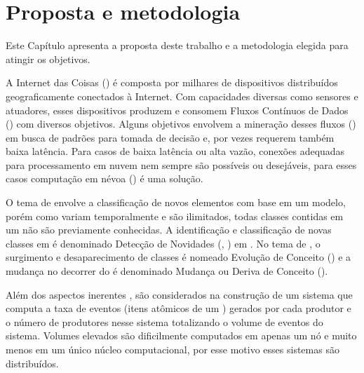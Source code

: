 \chapter{Proposta e metodologia}\label{cha:proposta}

\begin{resumocap}

  Este Capítulo apresenta a proposta deste trabalho e a metodologia elegida para
  atingir os objetivos.

\end{resumocap}


\newcommand{\mfog}{M-FOG\xspace}
\newcommand{\flink}{\emph{Apache Flink}\xspace}

A Internet das Coisas (\iot) é composta por milhares de dispositivos distribuídos
geograficamente conectados à Internet.
Com capacidades diversas como sensores e atuadores, esses dispositivos produzem e
consomem Fluxos Contínuos de Dados (\streams) com diversos objetivos.
Alguns objetivos envolvem a mineração desses fluxos (\streamMining) em busca de
padrões para tomada de decisão e, por vezes requerem também baixa latência.
Para casos de baixa latência ou alta vazão, conexões adequadas para
processamento em nuvem nem sempre são possíveis ou desejáveis, para esses casos
computação em névoa (\fog) é uma solução.

O tema de \streamMining envolve a classificação de novos elementos com base em
um modelo, porém como \streams variam temporalmente e são ilimitados, todas
classes contidas em um \stream não são previamente conhecidas.
A identificação e classificação de novas classes em \streams é denominado
Detecção de Novidades (\novelty, \nd) em \streams.
No tema de \nd, o surgimento e desaparecimento de classes é nomeado Evolução de Conceito
(\evolution) e a mudança no decorrer do \stream é denominado Mudança ou Deriva
de Conceito (\drift).

Além dos aspectos inerentes \streamMining, são considerados na construção de um
sistema que computa \streams a taxa de eventos (itens atômicos de um \stream)
gerados por cada produtor e o número de produtores nesse sistema totalizando o
volume de eventos do sistema.
Volumes elevados são dificilmente computados em apenas um nó e muito menos em um
único núcleo computacional, por esse motivo esses sistemas são distribuídos.


